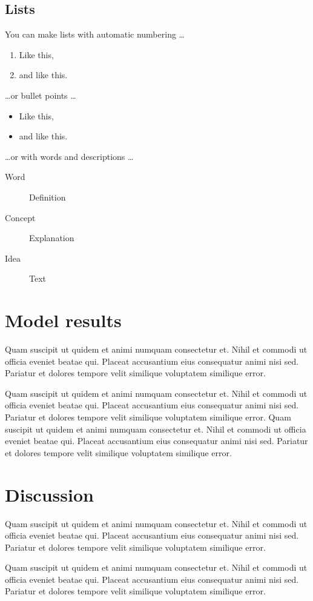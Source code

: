 \subsection{Lists}

You can make lists with automatic numbering \dots

\begin{enumerate}[noitemsep]
\item Like this,
\item and like this.
\end{enumerate}
\dots or bullet points \dots
\begin{itemize}[noitemsep]
\item Like this,
\item and like this.
\end{itemize}
\dots or with words and descriptions \dots
\begin{description}
\item[Word] Definition
\item[Concept] Explanation
\item[Idea] Text
\end{description}

\section{Model results}
Quam suscipit ut quidem et animi numquam consectetur et. Nihil et commodi ut officia eveniet beatae qui. Placeat accusantium eius consequatur animi nisi sed. Pariatur et dolores tempore velit similique voluptatem similique error.

Quam suscipit ut quidem et animi numquam consectetur et. Nihil et commodi ut officia eveniet beatae qui. Placeat accusantium eius consequatur animi nisi sed. Pariatur et dolores tempore velit similique voluptatem similique error. Quam suscipit ut quidem et animi numquam consectetur et. Nihil et commodi ut officia eveniet beatae qui. Placeat accusantium eius consequatur animi nisi sed. Pariatur et dolores tempore velit similique voluptatem similique error.

\section{Discussion}

Quam suscipit ut quidem et animi numquam consectetur et. Nihil et commodi ut officia eveniet beatae qui. Placeat accusantium eius consequatur animi nisi sed. Pariatur et dolores tempore velit similique voluptatem similique error.

Quam suscipit ut quidem et animi numquam consectetur et. Nihil et commodi ut officia eveniet beatae qui. Placeat accusantium eius consequatur animi nisi sed. Pariatur et dolores tempore velit similique voluptatem similique error.
